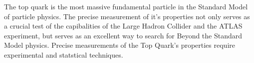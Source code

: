 %

The top quark is the most massive fundamental particle in the Standard Model of particle physics.
The precise measurement of it's properties not only serves as a crucial test of the capibalities of the Large Hadron Collider and the ATLAS experiment, but serves as an excellent way to search for Beyond the Standard Model physics.  
Precise measurements of the Top Quark's properties require experimental and statstical techniques.


